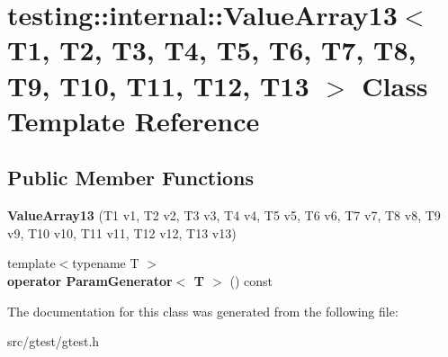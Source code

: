 \hypertarget{classtesting_1_1internal_1_1_value_array13}{}\section{testing\+:\+:internal\+:\+:Value\+Array13$<$ T1, T2, T3, T4, T5, T6, T7, T8, T9, T10, T11, T12, T13 $>$ Class Template Reference}
\label{classtesting_1_1internal_1_1_value_array13}
\subsection*{Public Member Functions}
\begin{DoxyCompactItemize}
\item 
\mbox{\label{classtesting_1_1internal_1_1_value_array13_a57505ac7a4fbb86f4121bf1d41b0352d}} 
{\bfseries Value\+Array13} (T1 v1, T2 v2, T3 v3, T4 v4, T5 v5, T6 v6, T7 v7, T8 v8, T9 v9, T10 v10, T11 v11, T12 v12, T13 v13)
\item 
\mbox{\label{classtesting_1_1internal_1_1_value_array13_a80572fc9c66a20824ae0934785b41f24}} 
{\footnotesize template$<$typename T $>$ }\\{\bfseries operator Param\+Generator$<$ T $>$} () const
\end{DoxyCompactItemize}


The documentation for this class was generated from the following file\+:\begin{DoxyCompactItemize}
\item 
src/gtest/gtest.\+h\end{DoxyCompactItemize}
